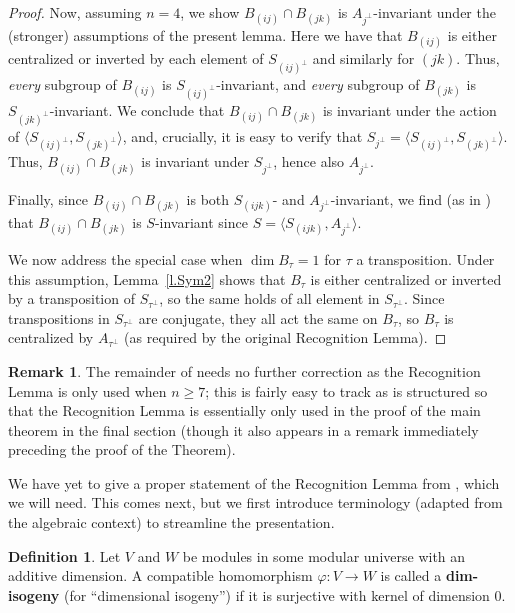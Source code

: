 \documentclass[a4paper, 11pt]{amsart}
\theoremstyle{plain}
\theoremstyle{definition}
\newtheorem{definition}[theorem]{Definition}
\newtheorem{remark}[theorem]{Remark}
\theoremstyle{remark}
\begin{document}
\begin{proof}
Now, assuming $n=4$,  we show $B_{(ij)} \cap B_{(jk)}$ is $A_{j^\perp}$-invariant under the (stronger) assumptions of the present lemma. Here we have that $B_{(ij)}$ is either centralized or inverted by each element of $S_{(ij)^\perp}$ and similarly for $(jk)$. Thus, \emph{every} subgroup of $B_{(ij)}$ is $S_{(ij)^\perp}$-invariant, and  \emph{every} subgroup of $B_{(jk)}$ is $S_{(jk)^\perp}$-invariant. We conclude that $B_{(ij)} \cap B_{(jk)}$ is invariant under the action of $\langle S_{(ij)^\perp}, S_{(jk)^\perp} \rangle$, and, crucially,  it is easy to verify that $S_{j^\perp} = \langle S_{(ij)^\perp}, S_{(jk)^\perp} \rangle$. Thus,  $B_{(ij)} \cap B_{(jk)}$ is invariant under $S_{j^\perp}$, hence also $A_{j^\perp}$.

Finally, since $B_{(ij)} \cap B_{(jk)}$ is both $S_{(ijk)}$- and $A_{j^\perp}$-invariant, we find (as in \cite{CDW23}) that $B_{(ij)} \cap B_{(jk)}$ is $S$-invariant since $S = \langle S_{(ijk)}, A_{j^\perp} \rangle$.

We now address the special case when $\dim B_\tau = 1$ for $\tau$ a transposition. Under this assumption, Lemma~\ref{l.Sym2} shows that $B_\tau$ is either centralized or inverted by a transposition of $S_{\tau^\perp}$, so the same holds of all element in $S_{\tau^\perp}$. Since  transpositions in $S_{\tau^\perp}$ are conjugate, they all act the same on $B_\tau$, so $B_\tau$ is centralized by $A_{\tau^\perp}$ (as required by the original  Recognition Lemma).
\end{proof}

\begin{remark}
The remainder of \cite{CDW23} needs no further correction as the Recognition Lemma is only used when $n\ge 7$; this is fairly easy to track as \cite{CDW23} is structured so that the Recognition Lemma is essentially only used in the proof of the main theorem in the final section (though it also appears in a remark immediately preceding the proof of the Theorem).
\end{remark}

We have yet to give a proper statement of the Recognition Lemma from \cite{CDW23}, which we will need. This comes next, but we first introduce  terminology (adapted from the algebraic context) to streamline the presentation.

\begin{definition}
Let $V$ and $W$ be modules in some modular universe with an additive dimension. A compatible homomorphism $\varphi:V\rightarrow W$ is called a \textbf{dim-isogeny} (for ``dimensional isogeny'') if it is surjective with  kernel of dimension $0$. 
\end{definition}
\end{document}
